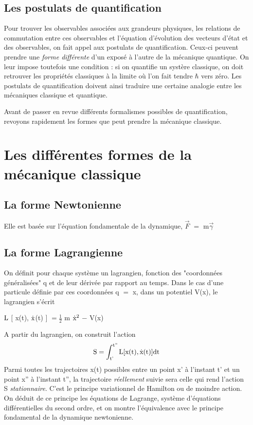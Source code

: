 \subsection{Les postulats de quantification}
Pour trouver les observables associées aux grandeurs physiques,
les relations de commutation entre
ces observables et l'équation d'évolution des vecteurs d'état et des
observables, on fait appel aux postulats de quantification. Ceux-ci
peuvent prendre une {\it forme différente} d'un exposé à l'autre de la
mécanique quantique. On leur impose toutefois une condition : si on
quantifie un systère classique, on doit retrouver les propriétés classiques
à la limite où l'on fait tendre $\hbar$ vers zéro. Les postulats de
quantification doivent ainsi traduire une certaine analogie entre les
mécaniques classique et quantique.

Avant de passer en revue différents formalismes possibles de
quantification, revoyons rapidement les formes que peut prendre la
mécanique classique.
\section{Les différentes formes de la mécanique classique}

\subsection{La forme Newtonienne}
Elle est basée sur l'équation fondamentale de la dynamique, $\vec{F}$ $=$ m$\vec{\gamma}$

\subsection{La forme Lagrangienne}
On définit pour chaque système un lagrangien,
fonction des "coordonnées généralisées" q et de leur dérivée par rapport
au temps. Dans le cas d'une particule définie par ces coordonnées q $=$ x,
dans un potentiel V(x), le lagrangien s'écrit

\begin{center}
$\text{L}$ $[$ x(t), $\dot{\text{x}}$(t) $]$ $= \frac{1}{2}$ m $\dot{\text{x}}^2$ $-$ V(x) 
\end{center}
A partir du lagrangien, on construit l'action
\[
\text{S} = \int_{\text{t'}}^{\text{t''}} \text{L} [ \text{x(t)}, \dot{\text{\text{x}}}\text{(t)} ] \text{dt}
\]
Parmi toutes les trajectoires x(t) possibles entre un point
x' à l'instant t' et un point x'' à l'instant t'', la trajectoire {\it réellement}
suivie sera celle qui rend l'action S {\it stationnaire}. C'est le principe
variationnel de Hamilton ou de moindre action. On déduit de ce
principe les équations de Lagrange, système d'équations différentielles
du second ordre, et on montre l'équivalence avec le principe fondamental
de la dynamique newtonienne.


